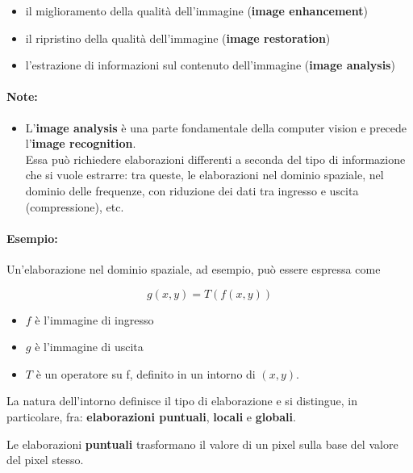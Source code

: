 \begin{itemize}
    \item il miglioramento della qualità dell'immagine (\textbf{image enhancement})
    \item il ripristino della qualità dell'immagine (\textbf{image restoration})
    \item l'estrazione di informazioni sul contenuto dell'immagine (\textbf{image analysis})
\end{itemize}

\paragraph{Note:}

\begin{itemize}
    \item L'\textbf{image analysis} è una parte fondamentale della computer vision e
          precede l'\textbf{image recognition}.\\
          Essa può richiedere elaborazioni differenti a seconda del tipo di
          informazione che si vuole estrarre: tra queste, le elaborazioni nel
          dominio spaziale, nel dominio delle frequenze, con riduzione dei
          dati tra ingresso e uscita (compressione), etc.
\end{itemize}

\paragraph{Esempio:}

Un'elaborazione nel dominio spaziale, ad esempio, può essere
espressa come

$$
    g(x , y) = T(f (x , y))
$$

\begin{itemize}
    \item $f$ è l'immagine di ingresso
    \item $g$ è l'immagine di uscita
    \item $T$ è un operatore su f, definito in un intorno di $(x , y)$.
\end{itemize}

La natura dell'intorno definisce il tipo di elaborazione e si distingue,
in particolare, fra: \textbf{elaborazioni puntuali}, \textbf{locali} e \textbf{globali}.

\begin{definition}
    Le elaborazioni \textbf{puntuali} trasformano il valore di un pixel sulla base del
    valore del pixel stesso.
\end{definition}

